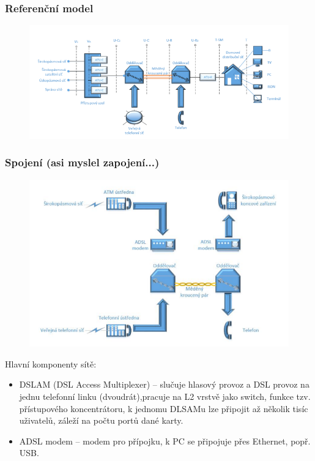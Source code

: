 \subsubsection{Referenční model}
\begin{figure} [h]
    \centering
    \includegraphics[scale=0.85]{snimky/ADSL model.png}
\end{figure}
\newpage
\subsubsection{Spojení (asi myslel zapojení...)}
\begin{figure} [h]
    \centering
    \includegraphics[scale=0.8]{snimky/zapoj.png}
\end{figure}

Hlavní komponenty sítě:
\begin{itemize}
    \item DSLAM (DSL Access Multiplexer) -- slučuje hlasový provoz a DSL provoz na jednu telefonní linku (dvoudrát),pracuje na L2 vrstvě jako switch, funkce tzv. přístupového koncentrátoru, k jednomu DLSAMu lze připojit až několik tisíc uživatelů, záleží na počtu portů dané karty.
    \item ADSL modem -- modem pro přípojku, k PC se připojuje přes Ethernet, popř. USB.
\end{itemize}

